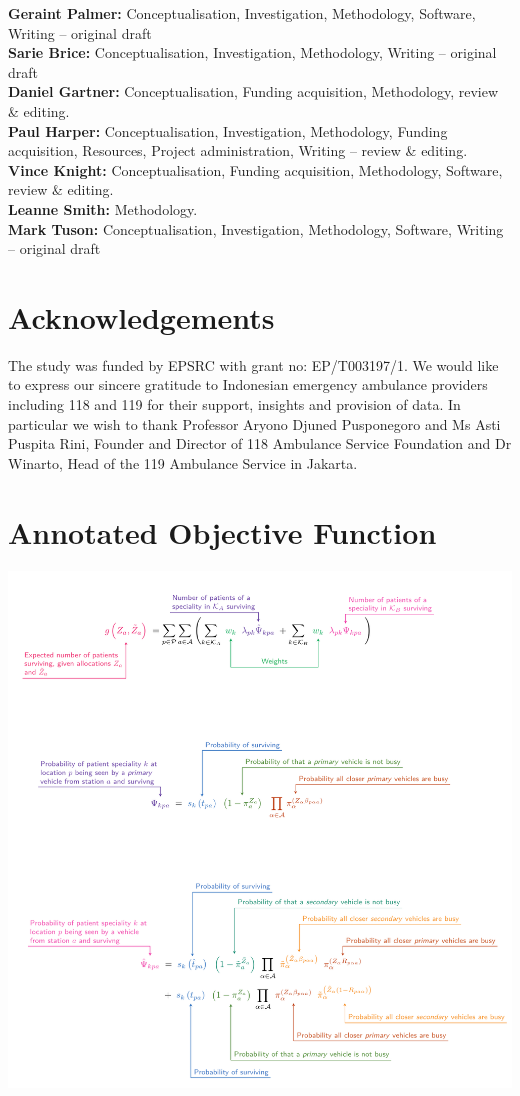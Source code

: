 \documentclass[preprint,12pt]{elsarticle}
\begin{document}
{\bf Geraint Palmer:} Conceptualisation, Investigation, Methodology, Software, Writing – original draft\\
{\bf Sarie Brice:} Conceptualisation, Investigation, Methodology, Writing – original draft\\
{\bf Daniel Gartner:} Conceptualisation, Funding acquisition, Methodology, review \& editing.\\
{\bf Paul Harper:} Conceptualisation, Investigation, Methodology, Funding acquisition, Resources, Project administration, Writing – review \& editing.\\
{\bf Vince Knight:} Conceptualisation, Funding acquisition, Methodology, Software, review \& editing.\\
{\bf Leanne Smith:} Methodology.\\
{\bf Mark Tuson:} Conceptualisation, Investigation, Methodology, Software, Writing – original draft\\



\section*{Acknowledgements}
The study was funded by EPSRC with grant no: EP/T003197/1. We would like to express our sincere gratitude to Indonesian emergency ambulance providers including 118 and 119 for their support, insights and provision of data. In particular we wish to thank Professor Aryono Djuned Pusponegoro and Ms Asti Puspita Rini, Founder and Director of 118 Ambulance Service Foundation and Dr Winarto, Head of the 119 Ambulance Service in Jakarta.


\appendix

\section{Annotated Objective Function}\label{apx:annotated}
\includegraphics[width=\textwidth]{img/annotate}
\end{document}
